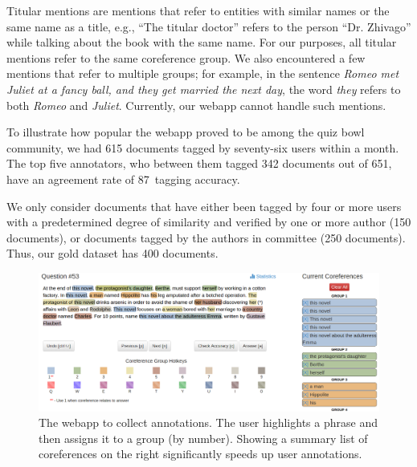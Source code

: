 Titular mentions are mentions that refer to entities with similar names or the
same name as a title, e.g., ``The titular doctor'' refers to the person
``Dr. Zhivago'' while talking about the book with the same name. For our purposes, all titular mentions refer to the same coreference group. We also encountered a few mentions that refer to multiple groups; for example, in the sentence \emph{Romeo met Juliet at a fancy ball, and they get married the next day}, the word \emph{they} refers to both \emph{Romeo} and \emph{Juliet}. Currently, our webapp cannot handle such mentions.

To illustrate how popular the webapp proved to be among the quiz bowl community,
we had 615 documents tagged by seventy-six users within a month.  The top five
annotators, who between them tagged 342 documents out of 651, have an agreement
rate of 87\
tagging accuracy.

We only consider documents that have either been tagged by four or more users with
a predetermined degree of similarity and verified by one or more
author (150 documents), or documents tagged
by the authors in committee (250 documents). Thus,
our gold dataset has 400 documents.

\begin{figure}[t!]
  \centering
  \includegraphics[scale=0.31]{2015_naacl_qb_coref/figures/webapp.png}
  \caption{The webapp to collect annotations. The user highlights
    a phrase and then assigns it to a group (by number).
    Showing a summary list of coreferences on the right significantly speeds up user
    annotations.}
  \label{fig:screenshot}
\end{figure}

